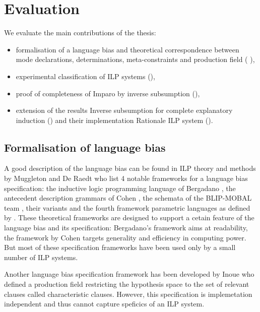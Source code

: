 \chapter{Evaluation}\label{ch:evaluation}
We evaluate the main contributions of the thesis:
\begin{itemize}
\item formalisation of a language bias and theoretical correspondence between mode declarations, determinations, meta-constraints and production field ( ),
\item experimental classification of ILP systems (),
\item proof of completeness of Imparo by inverse subsumption (),
\item extension of the results Inverse subsumption for complete explanatory induction () and their implementation Rationale ILP system ().
\end{itemize}

\section{Formalisation of language bias}
A good description of the language bias can be found in ILP theory and methods by Muggleton and De Raedt \cite{muggleton1994inductive} who list 4 notable frameworks for a language bias specification: the inductive logic programming language of
Bergadano \cite{bergadano1993interactive}, the antecedent description grammars of Cohen \cite{cohen1994grammatically}\cite{cohen1992compiling}, the schemata of
the BLIP-MOBAL team \cite{emde1983discovery}\cite{kietz1992controlling}, their variants \cite{de1992interactive}\cite{silverstein1991relational}
\cite{tausend1994representing} and the fourth framework parametric languages as defined by \cite{muggleton1992efficient}\cite{de1992interactive}
\cite{buntine1987induction}\cite{cohen1993learnability}.
These theoretical frameworks are designed to support a cetain feature of the language bias and its specification: Bergadano's framework aims at readability, the framework by Cohen targets generality and efficiency in computing power.
But most of these specification frameworks have been used only by a small number of ILP systems.

Another language bias specification framework has been developed by Inoue \cite{inoue1992linear} who defined a production field restricting the hypothesis space to the set of relevant clauses called characteristic clauses. However, this specification is implemetation independent and thus cannot capture speficics of an ILP system.

